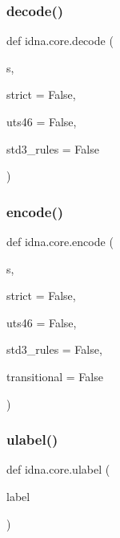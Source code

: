 \subsubsection{\texorpdfstring{decode()}{decode()}}
{\footnotesize\ttfamily def idna.\+core.\+decode (\begin{DoxyParamCaption}\item[{}]{s,  }\item[{}]{strict = {\ttfamily False},  }\item[{}]{uts46 = {\ttfamily False},  }\item[{}]{std3\+\_\+rules = {\ttfamily False} }\end{DoxyParamCaption})}

\mbox{\label{namespaceidna_1_1core_a59837421830fcf4bf8126228c24e192f}} 
\subsubsection{\texorpdfstring{encode()}{encode()}}
{\footnotesize\ttfamily def idna.\+core.\+encode (\begin{DoxyParamCaption}\item[{}]{s,  }\item[{}]{strict = {\ttfamily False},  }\item[{}]{uts46 = {\ttfamily False},  }\item[{}]{std3\+\_\+rules = {\ttfamily False},  }\item[{}]{transitional = {\ttfamily False} }\end{DoxyParamCaption})}

\mbox{\label{namespaceidna_1_1core_ac179e29d76b8dbc9de9fbbdbc9baba30}} 
\subsubsection{\texorpdfstring{ulabel()}{ulabel()}}
{\footnotesize\ttfamily def idna.\+core.\+ulabel (\begin{DoxyParamCaption}\item[{}]{label }\end{DoxyParamCaption})}

\mbox{\label{namespaceidna_1_1core_a2178e53e2ec5ef62f55547d5c1a1bb2e}} 
